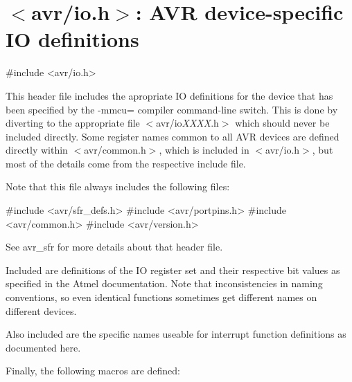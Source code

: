 \hypertarget{group__avr__io}{}\section{$<$avr/io.h$>$\+: A\+VR device-\/specific IO definitions}
\label{group__avr__io}

\begin{DoxyCode}
\textcolor{preprocessor}{#include <avr/io.h>} 
\end{DoxyCode}


This header file includes the apropriate IO definitions for the device that has been specified by the {\ttfamily -\/mmcu=} compiler command-\/line switch. This is done by diverting to the appropriate file {\ttfamily $<$avr/io}{\itshape X\+X\+XX}{\ttfamily .h$>$} which should never be included directly. Some register names common to all A\+VR devices are defined directly within {\ttfamily $<$avr/common.\+h$>$}, which is included in {\ttfamily $<$avr/io.\+h$>$}, but most of the details come from the respective include file.

Note that this file always includes the following files\+: 
\begin{DoxyCode}
\textcolor{preprocessor}{#include <avr/sfr\_defs.h>}
\textcolor{preprocessor}{#include <avr/portpins.h>}
\textcolor{preprocessor}{#include <avr/common.h>}
\textcolor{preprocessor}{#include <avr/version.h>}
\end{DoxyCode}
 See avr\+\_\+sfr for more details about that header file.

Included are definitions of the IO register set and their respective bit values as specified in the Atmel documentation. Note that inconsistencies in naming conventions, so even identical functions sometimes get different names on different devices.

Also included are the specific names useable for interrupt function definitions as documented here.

Finally, the following macros are defined\+:


